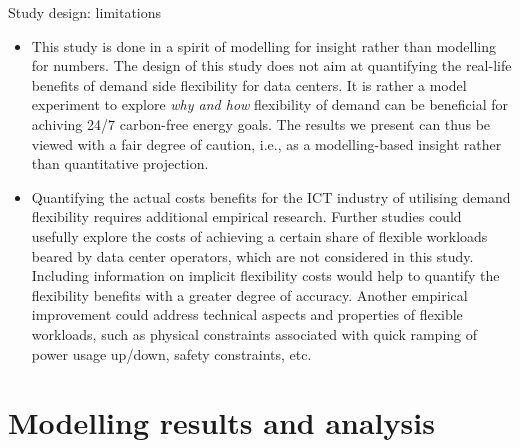 \begin{frame}{Study design: limitations}
  
  {\footnotesize 
  \begin{itemize}

  \item This study is done in a spirit of \alert{modelling for insight} rather than \alert{modelling for numbers}. The design of this study does not aim at quantifying the real-life benefits of demand side flexibility for data centers. It is rather a model experiment to explore \textit{why and how} flexibility of demand can be beneficial for achiving 24/7 carbon-free energy goals. The results we present can thus be viewed with a fair degree of caution, i.e., as a modelling-based insight rather than quantitative projection. 
  
  \item Quantifying the actual costs benefits for the ICT industry of utilising demand flexibility requires \alert{additional empirical research}. Further studies could usefully explore the costs of achieving a certain share of flexible workloads beared by data center operators, which are \alert{not considered} in this study. Including information on implicit flexibility costs would help to quantify the flexibility benefits with a greater degree of accuracy. Another empirical improvement could address technical aspects and properties of flexible workloads, such as physical constraints associated with quick ramping of power usage up/down, safety constraints, etc.
  
  \end{itemize}
  }
  \end{frame}


\section{Modelling results and analysis}



